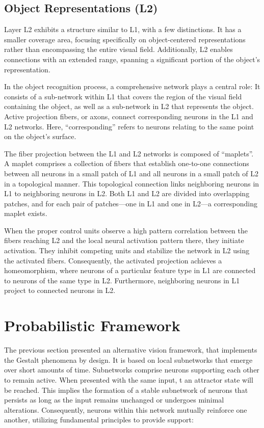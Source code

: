 \subsection{Object Representations (L2)}
Layer L2 exhibits a structure similar to L1, with a few distinctions. It has a smaller coverage area, focusing specifically on object-centered representations rather than encompassing the entire visual field. Additionally, L2 enables connections with an extended range, spanning a significant portion of the object's representation.

In the object recognition process, a comprehensive network plays a central role: It consists of a sub-network within L1 that covers the region of the visual field containing the object, as well as a sub-network in L2 that represents the object. Active projection fibers, or axons, connect corresponding neurons in the L1 and L2 networks. Here, ``corresponding'' refers to neurons relating to the same point on the object's surface.

The fiber projection between the L1 and L2 networks is composed of ``maplets''. A maplet comprises a collection of fibers that establish one-to-one connections between all neurons in a small patch of L1 and all neurons in a small patch of L2 in a topological manner. This topological connection links neighboring neurons in L1 to neighboring neurons in L2. Both L1 and L2 are divided into overlapping patches, and for each pair of patches—one in L1 and one in L2—a corresponding maplet exists.

When the proper control units observe a high pattern correlation between the fibers reaching L2 and the local neural activation pattern there, they initiate activation. They inhibit competing units and stabilize the network in L2 using the activated fibers. Consequently, the activated projection achieves a homeomorphism, where neurons of a particular feature type in L1 are connected to neurons of the same type in L2. Furthermore, neighboring neurons in L1 project to connected neurons in L2.



\section{Probabilistic Framework}
The previous section presented an alternative vision framework, that implements the Gestalt phenomena by design. It is based on local subnetworks that emerge over short amounts of time. Subnetworks comprise neurons supporting each other to remain active.
When presented with the same input, t an attractor state will be reached. This implies the formation of a stable subnetwork of neurons that persists as long as the input remains unchanged or undergoes minimal alterations. Consequently, neurons within this network mutually reinforce one another, utilizing fundamental principles to provide support:

